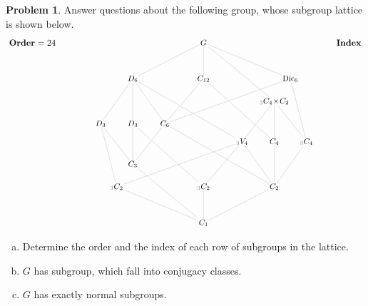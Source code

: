 \documentclass[12pt]{article}
\theoremstyle{definition} %
\newtheorem{problem}{Problem}
\begin{document}
\newpage
\begin{problem}
    Answer questions about the following group, whose subgroup
  lattice is shown below.
  \[
  \begin{tikzpicture}[shorten >= -3pt, shorten <= -3pt, scale=1.3,yscale=1.4]
    \begin{scope}[shift={(0,0)}]
    \tikzstyle{every node}=[font=\small]
      \node[anchor=east] at (-4.5,4) {\normalsize \textbf{Order} $=24$};
      \node[anchor=east] at (5,4) {\normalsize \textbf{Index}};
      \node (G) at (0,4) {$G$};
      \node (D6) at (-2.2,3.2) {$D_6$};
      \node (C12) at (0,3.2) {$C_{12}$};
      \node (Dic6) at (2.7,3.2) {$\Dic_6$};
      \node (C4xC2) at (2.2,2.7) {${}_{\color{midgrey} 3}C_4\!\times\!C_2$};
      \node (D3-1) at (-3.2,2.2) {$D_3$};
      \node (D3-2) at (-2.2,2.2) {$D_3$};
      \node (C6) at (-1.2,2.2) {$C_6$};
      \node (V4) at (1.2,1.8) {${}_{\color{midgrey} 3}V_4$};
      \node (C4-1) at (2.2,1.8) {$C_4$};
      \node (C4-2) at (3.2,1.8) {${}_{\color{midgrey} 3}C_4$};
      \node (C3) at (-2.2,1.3) {$C_3$};
      \node (C2-1) at (-2.7,.8) {${}_{\color{midgrey} 3}C_2$};
      \node (C2-3) at (0,.8) {${}_{\color{midgrey} 3}C_2$};
      \node (C2-2) at (2.2,.8) {$C_2$};
      \node (1) at (0,0) {$C_1$};
      \draw[faded] (G) to (D6); \draw[faded] (G) to (C12); 
      \draw[faded] (G) to (Dic6); \draw[faded] (G) to (C4xC2); 
      \draw[faded] (D6) to (D3-1); \draw[faded] (D6) to (D3-2); 
      \draw[faded] (D6) to (C6); \draw[faded] (D6) to (V4);
      \draw[faded] (C12) to (C6); \draw[faded] (C12) to (C4-1);
      \draw[faded] (Dic6) to (C6); \draw[faded] (Dic6) to (C4-2);
      \draw[faded] (C4xC2) to (V4); \draw[faded] (C4xC2) to (C4-1);
      \draw[faded] (C4xC2) to (C4-2);
      \draw[faded] (D3-1) to (C2-1); \draw[faded] (D3-1) to (C3);
      \draw[faded] (D3-2) to (C2-3); \draw[faded] (D3-2) to (C3);
      \draw[faded] (C6) to (C3); \draw[faded] (C6) to (C2-2); 
      \draw[faded] (C4-1) to (C2-2); \draw[faded] (C4-2) to (C2-2);
      \draw[faded] (V4) to (C2-1); \draw[faded] (V4) to (C2-2); \draw[faded] (V4) to (C2-3);
      \draw[faded] (C2-1) to (1); \draw[faded] (C2-2) to (1); 
      \draw[faded] (C2-3) to (1); \draw[faded] (C3) to (1);
    \end{scope}
    \end{tikzpicture}
  \]
  \begin{enumerate}[(a)]
    \item Determine the order and the index of each row of subgroups in the lattice.
  \item $G$ has \uline{\hfill} subgroup, which fall into \uline{\hfill}
    conjugacy classes. \smallskip
  \item $G$ has exactly \uline{\hfill} normal subgroups. \smallskip


\end{enumerate}
\end{problem}
\end{document}
